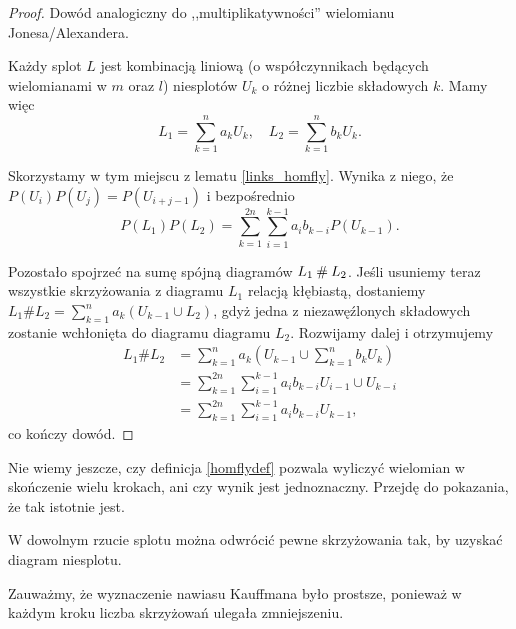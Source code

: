 \begin{proof}
    Dowód analogiczny do ,,multiplikatywności'' wielomianu Jonesa/Alexandera.
    
    Każdy splot $L$ jest kombinacją liniową (o współczynnikach będących wielomianami w $m$ oraz $l$) niesplotów $U_k$ o różnej liczbie składowych $k$.
    Mamy więc
    \[
        L_1 = \sum_{k=1}^n a_k U_k, \quad
        L_2 = \sum_{k=1}^n b_k U_k.
    \]

    Skorzystamy w tym miejscu z lematu \ref{links_homfly}.
    Wynika z niego, że $P(U_i)P(U_j) = P(U_{i+j-1})$ i bezpośrednio
    \[
        P(L_1)P(L_2) = \sum_{k=1}^{2n} \sum_{i=1}^{k-1} a_i b_{k-i}P(U_{k-1}).
    \]

    Pozostało spojrzeć na sumę spójną diagramów  $L_1 \mathbin{\#} L_2$.
    Jeśli usuniemy teraz wszystkie skrzyżowania z diagramu $L_1$ relacją kłębiastą, dostaniemy $L_1 \# L_2 = \sum_{k=1}^n a_k (U_{k-1} \cup L_2)$, gdyż jedna z niezawęźlonych składowych zostanie wchłonięta do diagramu diagramu $L_2$.
    Rozwijamy dalej i otrzymujemy
    \begin{align*}
        L_1 \# L_2 & = \sum_{k=1}^n a_k \left(U_{k-1} \cup \sum_{k=1}^n b_k U_k\right) \\ 
                   & = \sum_{k=1}^{2n} \sum_{i=1}^{k-1} a_i b_{k-i} U_{i-1} \cup U_{k-i} \\ 
                   & = \sum_{k=1}^{2n} \sum_{i=1}^{k-1} a_i b_{k-i} U_{k-1},
    \end{align*}
    co kończy dowód.
\end{proof}

Nie wiemy jeszcze, czy definicja \ref{homflydef} pozwala wyliczyć wielomian w skończenie wielu krokach, ani czy wynik jest jednoznaczny.
Przejdę do pokazania, że tak istotnie jest.

\begin{lemma}
    W dowolnym rzucie splotu można odwrócić pewne skrzyżowania tak, by uzyskać diagram niesplotu.
\end{lemma}

Zauważmy, że wyznaczenie nawiasu Kauffmana było prostsze, ponieważ w każdym kroku liczba skrzyżowań ulegała zmniejszeniu.

